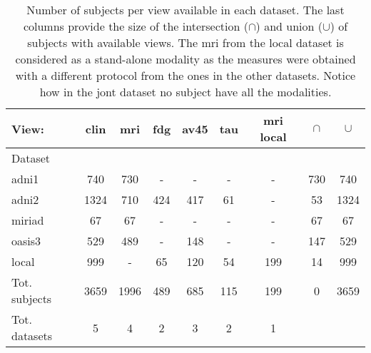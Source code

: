 \begin{table*}[!t]
\caption{
Number of subjects per view available in each dataset.
The last columns provide the size of the intersection ($\cap$) and union ($\cup$) of subjects with available views.
The mri from the local dataset is considered as a stand-alone modality as the measures were obtained with a different protocol from the ones in the other datasets.
Notice how in the jont dataset no subject have all the modalities.
}
\centering
\begin{tabular}{lcccccc|cc}
\toprule
View: &    clin &   mri &  fdg & av45 &  tau & mri local & $\cap$ & $\cup$ \\
\midrule
Dataset \\
adni1          &   740 &   730 &    - &    - &    - &          - & 730 &  740 \\
adni2          &  1324 &   710 &  424 &  417 &   61 &          - &  53 & 1324 \\
miriad         &    67 &    67 &    - &    - &    - &          - &  67 &   67 \\
oasis3         &   529 &   489 &    - &  148 &    - &          - & 147 &  529 \\
local          &   999 &     - &   65 &  120 &   54 &        199 &  14 &  999 \\
\midrule
Tot. subjects  &  3659 &  1996 &  489 &  685 &  115 &        199 &   0 & 3659 \\
\midrule
Tot. datasets  & 5     & 4     & 2    & 3    & 2    & 1          &     &      \\
\bottomrule
\end{tabular}
\label{table:datasets}
\end{table*}
